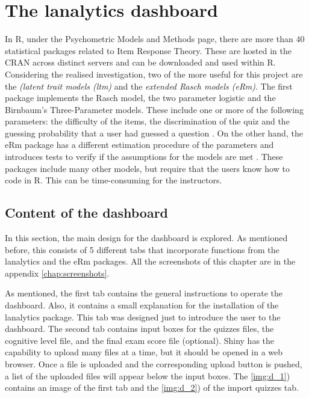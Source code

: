 \section{The lanalytics dashboard}

In R, under the Psychometric Models and Methods page, there are more than 40 statistical packages related to Item Response Theory. These are hosted in the CRAN across distinct servers and can be downloaded and used within R. Considering the realised investigation, two of the more useful for this project are the \textit{(latent trait models (ltm)} and the \textit{extended Rasch models (eRm)}. The first package implements the Rasch model, the two parameter logistic and the Birnbaum's Three-Parameter models. These include one or more of the following parameters: the difficulty of the items, the discrimination of the quiz and the guessing probability that a user had guessed a question \cite{rizopoulos2006ltm}. On the other hand, the eRm package has a different estimation procedure of the parameters and introduces tests to verify if the assumptions for the models are met \cite{mair2009extended}. These packages include many other models, but require that the users know how to code in R. This can be time-consuming for the instructors. 

\subsection{Content of the dashboard}

In this section, the main design for the dashboard is explored. As mentioned before, this consists of 5 different tabs that incorporate functions from the lanalytics and the eRm packages. All the screenshots of this chapter are in the appendix \ref{chap:screenshots}.

\vspace{4 mm}
\vspace{2 mm}

As mentioned, the first tab contains the general instructions to operate the dashboard. Also, it contains a small explanation for the installation of the lanalytics package. This tab was designed just to introduce the user to the dashboard. The second tab contains input boxes for the quizzes files, the cognitive level file, and the final exam score file (optional). Shiny has the capability to upload many files at a time, but it should be opened in a web browser. Once a file is uploaded and the corresponding upload button is pushed, a list of the uploaded files will appear below the input boxes. The \cref{img:d_1}) contains an image of the first tab and the \cref{img:d_2}) of the import quizzes tab.

